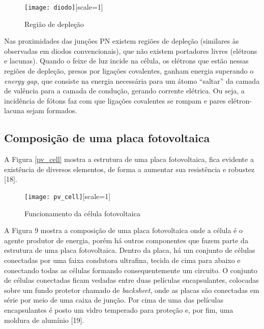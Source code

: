 \begin{figure}[ht!]
	\centering
	\caption{Região de depleção}
	\label{fig:diodo}
	\texttt{[image: diodo]}[scale=1]
\end{figure}

Nas proximidades das junções PN existem regiões de depleção (similares às observadas em diodos convencionais), que não existem portadores livres (elétrons e lacunas). Quando o feixe de luz incide na célula, os elétrons que estão nessas regiões de depleção, presos por ligações covalentes, ganham energia superando o \emph{energy gap}, que consiste na energia necessária para um átomo ``saltar'' da camada de valência para a camada de condução, gerando corrente elétrica. Ou seja, a incidência de fótons faz com que ligações covalentes se rompam e pares elétron-lacuna sejam formados.

\subsection{Composição de uma placa fotovoltaica}

A Figura \ref{pv_cell} mostra a estrutura de uma placa fotovoltaica, fica evidente a existência de diversos elementos, de forma a aumentar sua resistência e robustez [18].

\begin{figure}[ht!]
	\centering
	\caption{Funcionamento da célula fotovoltaica}
	\label{fig:pv_cell}
	\texttt{[image: pv\_cell]}[scale=1]
\end{figure}

A Figura 9 mostra a composição de uma placa fotovoltaica onde a célula é o agente produtor de energia, porém há outros componentes que fazem parte da estrutura de uma placa fotovoltaica. Dentro da placa, há um conjunto de células conectadas por uma faixa condutora ultrafina, tecida de cima para abaixo e conectando todas as células formando consequentemente um circuito. O conjunto de células conectadas ficam vedadas entre duas películas encapsulantes, colocadas sobre um fundo protetor chamado de \emph{backsheet}, onde as placas são conectadas em série por meio de uma caixa de junção. Por cima de uma das películas encapsulantes é posto um vidro temperado para proteção e, por fim, uma moldura de alumínio [19].

